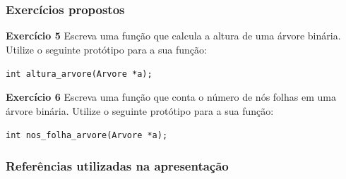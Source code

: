 \documentclass{beamer}
\begin{document}
\begin{frame}
  \frametitle{Exercícios propostos}

  \textbf{Exercício 5} Escreva uma função que calcula a altura de uma árvore
  binária. Utilize o seguinte protótipo para a sua função:

  \texttt{int altura\_arvore(Arvore *a);}

  \vspace{1cm}

  \textbf{Exercício 6} Escreva uma função que conta o número de nós
  folhas em uma árvore binária.
  Utilize o seguinte protótipo para a sua função:

  \texttt{int nos\_folha\_arvore(Arvore *a);}

\end{frame}

\begin{frame}[allowframebreaks]
  \frametitle{Referências utilizadas na apresentação}
  
\end{frame}
\end{document}
